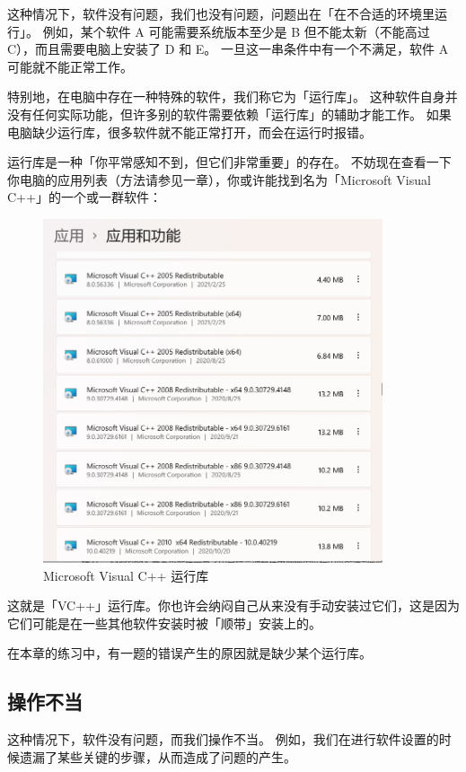这种情况下，软件没有问题，我们也没有问题，问题出在「在不合适的环境里运行」。
例如，某个软件 A 可能需要系统版本至少是 B 但不能太新（不能高过 C），而且需要电脑上安装了 D 和 E。
一旦这一串条件中有一个不满足，软件 A 可能就不能正常工作。

特别地，在电脑中存在一种特殊的软件，我们称它为「运行库」。
这种软件自身并没有任何实际功能，但许多别的软件需要依赖「运行库」的辅助才能工作。
如果电脑缺少运行库，很多软件就不能正常打开，而会在运行时报错。

运行库是一种「你平常感知不到，但它们非常重要」的存在。
不妨现在查看一下你电脑的应用列表（方法请参见一章），你或许能找到名为「Microsoft Visual C++」的一个或一群软件：

\begin{figure}[htb!]
  \centering
  \includegraphics[width=10cm]{assets/VCpp_Distribution.png}
  \caption{Microsoft Visual C++ 运行库}
  \label{VCpp_Distribution}
\end{figure}

这就是「VC++」运行库。你也许会纳闷自己从来没有手动安装过它们，这是因为它们可能是在一些其他软件安装时被「顺带」安装上的。

在本章的练习中，有一题的错误产生的原因就是缺少某个运行库。

\subsection{操作不当}

这种情况下，软件没有问题，而我们操作不当。
例如，我们在进行软件设置的时候遗漏了某些关键的步骤，从而造成了问题的产生。

